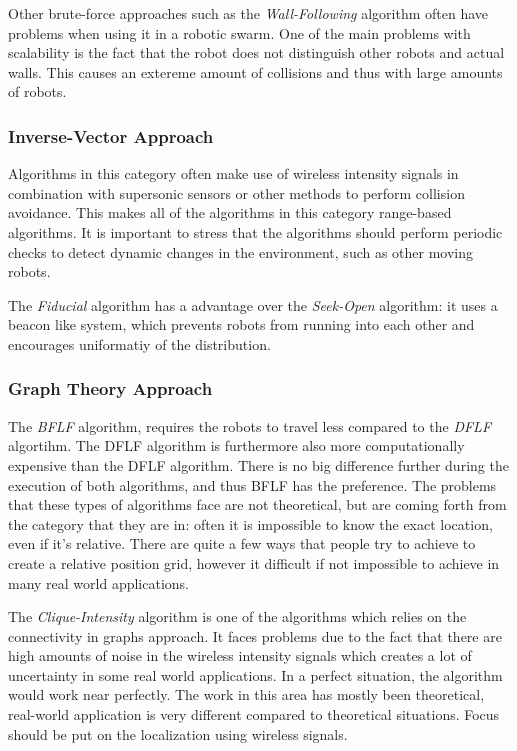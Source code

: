 Other brute-force approaches such as the \emph{Wall-Following} algorithm often have problems when using it in a robotic swarm. 
One of the main problems with scalability is the fact that the robot does not distinguish other robots and actual walls.
This causes an extereme amount of collisions and thus with large amounts of robots.

\subsubsection{Inverse-Vector Approach}
Algorithms in this category often make use of wireless intensity signals in combination with supersonic sensors or other methods to perform collision avoidance.
This makes all of the algorithms in this category range-based algorithms.
It is important to stress that the algorithms should perform periodic checks to detect dynamic changes in the environment, such as other moving robots. 

The \emph{Fiducial} algorithm has a advantage over the \emph{Seek-Open} algorithm: it uses a beacon like system, which prevents robots from running into each other and encourages uniformatiy of the distribution.

\subsubsection{Graph Theory Approach}
The \emph{BFLF} algorithm, requires the robots to travel less compared to the \emph{DFLF} algortihm. The DFLF algorithm is furthermore also more computationally expensive than the DFLF algorithm.
There is no big difference further during the execution of both algorithms, and thus BFLF has the preference.
The problems that these types of algorithms face are not theoretical, but are coming forth from the category that they are in: often it is impossible to know the exact location, even if it's relative.
There are quite a few ways that people try to achieve to create a relative position grid, however it difficult if not impossible to achieve in many real world applications.

The \emph{Clique-Intensity} algorithm is one of the algorithms which relies on the connectivity in graphs approach.
It faces problems due to the fact that there are high amounts of noise in the wireless intensity signals which creates a lot of uncertainty in some real world applications.
In a perfect situation, the algorithm would work near perfectly.
The work in this area has mostly been theoretical, real-world application is very different compared to theoretical situations.
Focus should be put on the localization using wireless signals.\\

